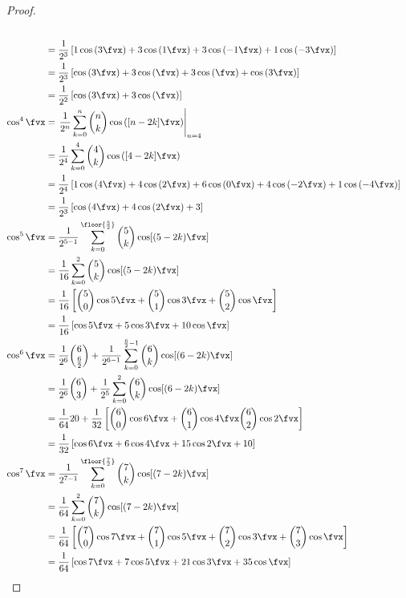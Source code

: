 \begin{proof}
\begin{align*}
  \\&= \frac{1}{2^3} \left[
         1\cos\left( 3\fvx\right) +
         3\cos\left( 1\fvx\right) +
         3\cos\left(-1\fvx\right) +
         1\cos\left(-3\fvx\right) 
       \right]
  \\&= \frac{1}{2^3} \left[
          \cos\left( 3\fvx\right) +
         3\cos\left(  \fvx\right) +
         3\cos\left(  \fvx\right) +
          \cos\left( 3\fvx\right) 
       \right]
  \\&= \frac{1}{2^2} \left[
          \cos\left( 3\fvx\right) +
         3\cos\left(  \fvx\right) 
       \right]
  \\
  \cos^4\fvx
    &= \left.\frac{1}{2^n} \sum_{k=0}^n \binom{n}{k}\cos\left([n-2k]\fvx\right)\right|_{n=4}
  \\&= \frac{1}{2^4} \sum_{k=0}^4 \binom{4}{k}\cos\left([4-2k]\fvx\right)
  \\&= \frac{1}{2^4} \left[
         1\cos\left( 4\fvx\right) +
         4\cos\left( 2\fvx\right) +
         6\cos\left( 0\fvx\right) +
         4\cos\left(-2\fvx\right) +
         1\cos\left(-4\fvx\right) 
       \right]
  \\&= \frac{1}{2^3} \left[
          \cos\left( 4\fvx\right) +
         4\cos\left( 2\fvx\right) +
         3 
       \right]
  \\
  \cos^5\fvx
    &= \frac{1}{2^{5-1}} \sum_{k=0}^{\floor{\frac{5}{2}}} \binom{5}{k}\cos[(5-2k)\fvx] 
  \\&= \frac{1}{16} \sum_{k=0}^2 \binom{5}{k}\cos[(5-2k)\fvx] 
  \\&= \frac{1}{16} 
       \left[
         \binom{5}{0}\cos5\fvx + \binom{5}{1}\cos3\fvx + 
         \binom{5}{2}\cos\fvx 
       \right]
  \\&= \frac{1}{16} \left[\cos5\fvx + 5\cos3\fvx + 10\cos\fvx \right]
  \\
  \cos^6\fvx
    &= \frac{1}{2^6}\binom{6}{\frac{6}{2}} +
       \frac{1}{2^{6-1}} \sum_{k=0}^{\frac{6}{2}-1} \binom{6}{k}\cos[(6-2k)\fvx] 
  \\&= \frac{1}{2^6}\binom{6}{3} + 
       \frac{1}{2^5}\sum_{k=0}^{2} \binom{6}{k}\cos[(6-2k)\fvx] 
  \\&= \frac{1}{64}20 + 
       \frac{1}{32}\left[
         \binom{6}{0}\cos6\fvx + \binom{6}{1}\cos4\fvx 
         \binom{6}{2}\cos2\fvx 
         \right]
  \\&= \frac{1}{32}\left[\cos6\fvx + 6\cos4\fvx + 15\cos2\fvx + 10\right]
  \\
  \cos^7\fvx
    &= \frac{1}{2^{7-1}} \sum_{k=0}^{\floor{\frac{7}{2}}} \binom{7}{k}\cos[(7-2k)\fvx] 
  \\&= \frac{1}{64} \sum_{k=0}^2 \binom{7}{k}\cos[(7-2k)\fvx] 
  \\&= \frac{1}{64} 
       \left[
         \binom{7}{0}\cos7\fvx + \binom{7}{1}\cos5\fvx + \binom{7}{2}\cos3\fvx + 
         \binom{7}{3}\cos\fvx 
       \right]
  \\&= \frac{1}{64} \left[\cos7\fvx + 7\cos5\fvx + 21\cos3\fvx + 35\cos\fvx \right]
\end{align*}


\end{proof}
